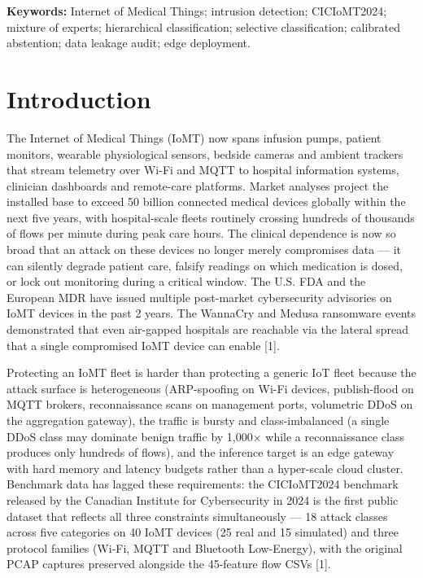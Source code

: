 \documentclass[11pt]{article}
\begin{document}
\noindent\textbf{Keywords:} Internet of Medical Things; intrusion detection; CICIoMT2024; mixture of experts; hierarchical classification; selective classification; calibrated abstention; data leakage audit; edge deployment.

\section{Introduction}
The Internet of Medical Things (IoMT) now spans infusion pumps, patient monitors, wearable physiological sensors, bedside cameras and ambient trackers that stream telemetry over Wi-Fi and MQTT to hospital information systems, clinician dashboards and remote-care platforms. Market analyses project the installed base to exceed 50 billion connected medical devices globally within the next five years, with hospital-scale fleets routinely crossing hundreds of thousands of flows per minute during peak care hours. The clinical dependence is now so broad that an attack on these devices no longer merely compromises data --- it can silently degrade patient care, falsify readings on which medication is dosed, or lock out monitoring during a critical window. The U.S. FDA and the European MDR have issued multiple post-market cybersecurity advisories on IoMT devices in the past 2 years. The WannaCry and Medusa ransomware events demonstrated that even air-gapped hospitals are reachable via the lateral spread that a single compromised IoMT device can enable [1].

Protecting an IoMT fleet is harder than protecting a generic IoT fleet because the attack surface is heterogeneous (ARP-spoofing on Wi-Fi devices, publish-flood on MQTT brokers, reconnaissance scans on management ports, volumetric DDoS on the aggregation gateway), the traffic is bursty and class-imbalanced (a single DDoS class may dominate benign traffic by 1,000× while a reconnaissance class produces only hundreds of flows), and the inference target is an edge gateway with hard memory and latency budgets rather than a hyper-scale cloud cluster. Benchmark data has lagged these requirements: the CICIoMT2024 benchmark released by the Canadian Institute for Cybersecurity in 2024 is the first public dataset that reflects all three constraints simultaneously --- 18 attack classes across five categories on 40 IoMT devices (25 real and 15 simulated) and three protocol families (Wi-Fi, MQTT and Bluetooth Low-Energy), with the original PCAP captures preserved alongside the 45-feature flow CSVs [1].
\end{document}
